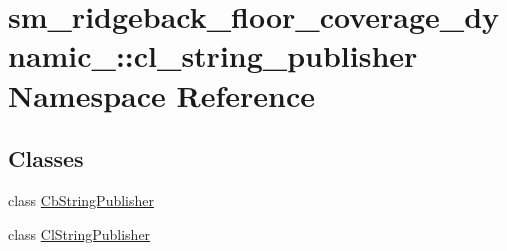\hypertarget{namespacesm__ridgeback__floor__coverage__dynamic__1_1_1cl__string__publisher}{}\section{sm\+\_\+ridgeback\+\_\+floor\+\_\+coverage\+\_\+dynamic\+\_\+:\+:cl\+\_\+string\+\_\+publisher Namespace Reference}
\label{namespacesm__ridgeback__floor__coverage__dynamic__1_1_1cl__string__publisher}
\subsection*{Classes}
\begin{DoxyCompactItemize}
\item 
class \hyperlink{classsm__ridgeback__floor__coverage__dynamic__1_1_1cl__string__publisher_1_1CbStringPublisher}{Cb\+String\+Publisher}
\item 
class \hyperlink{classsm__ridgeback__floor__coverage__dynamic__1_1_1cl__string__publisher_1_1ClStringPublisher}{Cl\+String\+Publisher}
\end{DoxyCompactItemize}
